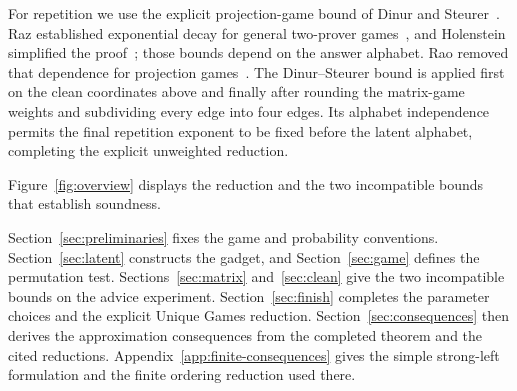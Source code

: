 For repetition we use the explicit projection-game bound of Dinur and
Steurer~\cite[Corollary~1.2]{DS14}. Raz established exponential decay
for general two-prover games~\cite{Raz98}, and Holenstein simplified the
proof~\cite{Holenstein2009}; those bounds depend on the answer alphabet.
Rao removed that dependence for projection games~\cite[Theorem~4]{Rao11}.
The Dinur--Steurer bound is applied first on the clean coordinates above
and finally after rounding the matrix-game weights and subdividing every
edge into four edges. Its alphabet independence permits the final
repetition exponent to be fixed before the latent alphabet, completing
the explicit unweighted reduction.

Figure~\ref{fig:overview} displays the reduction and the two incompatible
bounds that establish soundness.


Section~\ref{sec:preliminaries} fixes the game and probability conventions.
Section~\ref{sec:latent} constructs the gadget, and
Section~\ref{sec:game} defines the permutation test.
Sections~\ref{sec:matrix} and~\ref{sec:clean} give the two incompatible
bounds on the advice experiment. Section~\ref{sec:finish} completes
the parameter choices and the explicit Unique Games reduction.
Section~\ref{sec:consequences} then derives the approximation consequences
from the completed theorem and the cited reductions.
Appendix~\ref{app:finite-consequences} gives the simple strong-left
formulation and the finite ordering reduction used there.

